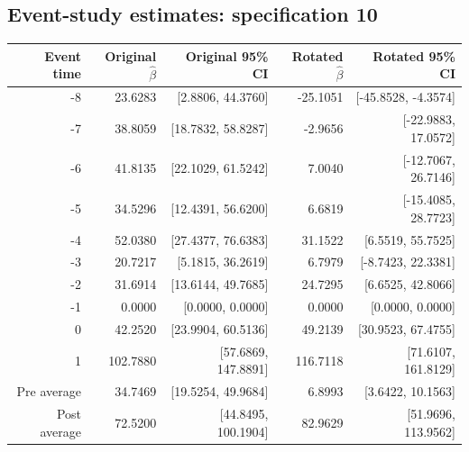 \documentclass[10pt]{article}
\begin{document}
\subsection*{Event-study estimates: specification 10}
\begin{center}\scriptsize
\begin{tabular}{r rr rr}
\toprule
Event time & Original $\hat\beta$ & Original 95\% CI & Rotated $\hat\beta$ & Rotated 95\% CI \\
\midrule
-8 & 23.6283 & [2.8806, 44.3760] & -25.1051 & [-45.8528, -4.3574] \\
-7 & 38.8059 & [18.7832, 58.8287] & -2.9656 & [-22.9883, 17.0572] \\
-6 & 41.8135 & [22.1029, 61.5242] & 7.0040 & [-12.7067, 26.7146] \\
-5 & 34.5296 & [12.4391, 56.6200] & 6.6819 & [-15.4085, 28.7723] \\
-4 & 52.0380 & [27.4377, 76.6383] & 31.1522 & [6.5519, 55.7525] \\
-3 & 20.7217 & [5.1815, 36.2619] & 6.7979 & [-8.7423, 22.3381] \\
-2 & 31.6914 & [13.6144, 49.7685] & 24.7295 & [6.6525, 42.8066] \\
-1 & 0.0000 & [0.0000, 0.0000] & 0.0000 & [0.0000, 0.0000] \\
0 & 42.2520 & [23.9904, 60.5136] & 49.2139 & [30.9523, 67.4755] \\
1 & 102.7880 & [57.6869, 147.8891] & 116.7118 & [71.6107, 161.8129] \\
\midrule
Pre average & 34.7469 & [19.5254, 49.9684] & 6.8993 & [3.6422, 10.1563] \\
Post average & 72.5200 & [44.8495, 100.1904] & 82.9629 & [51.9696, 113.9562] \\
\bottomrule
\end{tabular}
\end{center}
\clearpage
\end{document}
